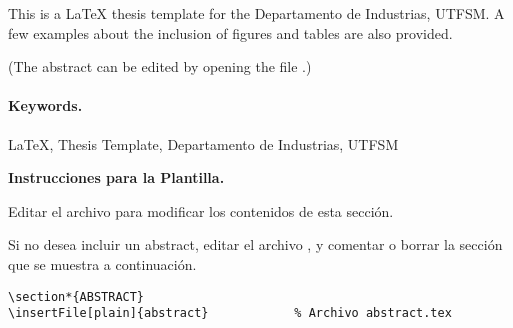 
This is a \LaTeX{} thesis template for the Departamento de Industrias, UTFSM. A few examples about the inclusion of figures and tables are also provided.

(The abstract can be edited by opening the file .)

\vspace{20mm}

\paragraph{Keywords.}
\LaTeX{}, Thesis Template, Departamento de Industrias, UTFSM

\vspace{20mm}


\begin{framed}
\noindent\textbf{Instrucciones para la Plantilla.}

Editar el archivo  para modificar los contenidos de esta sección.

Si no desea incluir un abstract, editar el archivo , y comentar o borrar la sección que se muestra a continuación.

\begin{Verbatim}[frame=lines, label=\inlinecode{/memoria.tex} (extracto)
				, fontsize=\footnotesize
				, baselinestretch=1
				, formatcom=\color{gray}]
\section*{ABSTRACT}
\insertFile[plain]{abstract}			% Archivo abstract.tex
\end{Verbatim}

\end{framed}
